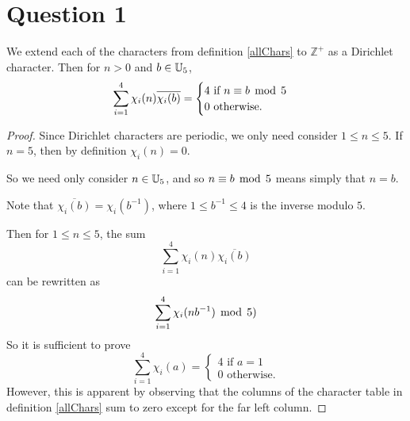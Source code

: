 \documentclass{unswmaths}
\begin{document}
\section*{Question 1}
\begin{lemma}
    We extend each of the characters from definition \ref{allChars} to $\mathbb{Z}^+$ as
    a Dirichlet character. Then for $n > 0$ and $b \in \mathbb{U}_5$, 
    \begin{equation*}
        \sum_{i=1}^4 \chi_i(n)\overline{\chi_i(b)} = \begin{cases}
            4\text{ if }n\equiv b\;\operatorname{mod}\;5\\
            0\text{ otherwise.}
        \end{cases}
    \end{equation*}
\end{lemma}
\begin{proof}
    Since Dirichlet characters are periodic, we only need consider $1 \leq n \leq 5$. If $n = 5$, then 
    by definition $\chi_i(n) = 0$.
    
    So we need only consider $n \in \mathbb{U}_5$, and so $n\equiv b\;\operatorname{mod}\;5$ means simply that $n = b$. 
    
    Note that $\overline{\chi_i(b)} = \chi_i(b^{-1})$, where $1 \leq b^{-1} \leq 4$ is the inverse modulo $5$.
    
    Then for $1 \leq n \leq 5$, the sum
    \begin{equation*}
        \sum_{i=1}^4 \chi_i(n)\overline{\chi_i(b)}
    \end{equation*}
    can be rewritten as
    \begin{equation*}
        \sum_{i=1}^4 \chi_i(nb^{-1}) \;\operatorname{mod}\;5)
    \end{equation*}
    So it is sufficient to prove
    \begin{equation*}
        \sum_{i=1}^4 \chi_i(a) = \begin{cases}
            4\text{ if }a = 1\\
            0\text{ otherwise.}
        \end{cases}
    \end{equation*}
    However, this is apparent by observing that the columns of the character table in definition \ref{allChars} sum to zero
    except for the far left column.
\end{proof}
\end{document}
